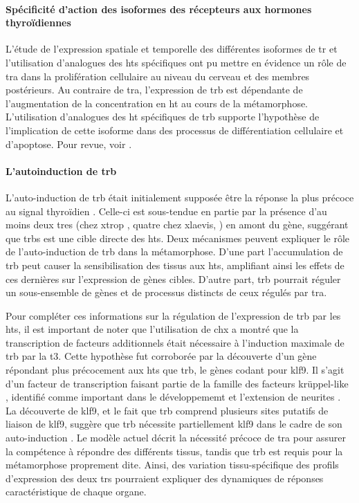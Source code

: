 \documentclass[../main.tex]{subfiles}
\begin{document}
\paragraph{Spécificité d'action des isoformes des récepteurs aux hormones thyroïdiennes}
L'étude de l'expression spatiale et temporelle des différentes isoformes de \gls{tr} et l'utilisation d'analogues des \glspl{ht} spécifiques ont pu mettre en évidence un rôle de \gls{tra} dans la prolifération cellulaire au niveau du cerveau et des membres postérieurs.
Au contraire de \gls{tra}, l'expression de \gls{trb} est dépendante de l'augmentation de la concentration en \gls{ht} au cours de la métamorphose.
L'utilisation d'analogues des \gls{ht} spécifiques de \gls{trb} supporte l'hypothèse de l'implication de cette isoforme dans des processus de différentiation cellulaire et d'apoptose.
Pour revue, voir \citep{Furlow2006,Denver2009a}.

\paragraph{L'autoinduction de \gls{trb}}
L'auto-induction de \gls{trb} était initialement supposée être la réponse la plus précoce au signal thyroïdien \citep{Yaoita1990}.
Celle-ci est sous-tendue en partie par la présence d'au moins deux \glspl{tre} (chez \gls{xtrop} \citealp{Bilesimo2011}, quatre chez \gls{xlaevis}, \citealp{Ranjan1994,Machuca1995,Urnov2001}) en amont du gène, suggérant que \glspl{trb} est une cible directe des \glspl{ht}.
Deux mécanismes peuvent expliquer le rôle de l'auto-induction de \gls{trb} dans la métamorphose.
D'une part l'accumulation de \gls{trb} peut causer la sensibilisation des tissus aux \glspl{ht}, amplifiant ainsi les effets de ces dernières sur l'expression de gènes cibles.
D'autre part, \gls{trb} pourrait réguler un sous-ensemble de gènes et de processus distincts de ceux régulés par \gls{tra}.
\par
Pour compléter ces informations sur la régulation de l'expression de \gls{trb} par les \glspl{ht}, il est important de noter que l'utilisation de \gls{chx} a montré que la transcription de facteurs additionnels était nécessaire à l'induction maximale de \gls{trb} par la \gls{t3}.
Cette hypothèse fut corroborée par la découverte d'un gène répondant plus précocement aux \glspl{ht} que \gls{trb}, le gènes codant pour \gls{klf9}.
Il s'agit d'un facteur de transcription faisant partie de la famille des facteurs krüppel-like \citep{Knoedler2014}, identifié comme important dans le développememt et l'extension de neurites \citep{Scobie2009}.
La découverte de \gls{klf9}, et le fait que \gls{trb} comprend plusieurs sites putatifs de liaison de \gls{klf9}, suggère que \gls{trb} nécessite partiellement \gls{klf9} dans le cadre de son auto-induction \citep{Bagamasbad2008}.
Le modèle actuel décrit la nécessité précoce de \gls{tra} pour assurer la compétence à répondre des différents tissus, tandis que \gls{trb} est requis pour la métamorphose proprement dite.
Ainsi, des variation tissu-spécifique des profils d'expression des deux \glspl{tr} pourraient expliquer des dynamiques de réponses caractéristique de chaque organe.
\end{document}
